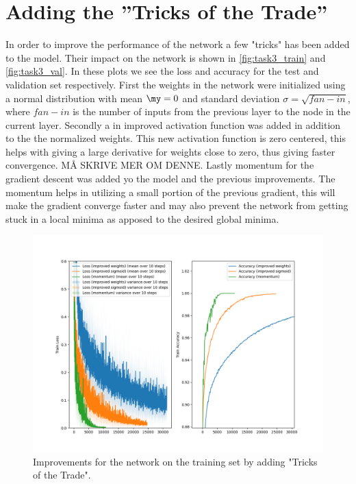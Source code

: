 \documentclass{article}
\begin{document}
\section{Adding the ”Tricks of the Trade”}
In order to improve the performance of the network a few "tricks" has been added to the model. Their impact on the network is shown in \autoref{fig:task3_train} and \autoref{fig:task3_val}. In these plots we see the loss and accuracy for the test and validation set respectively. First the weights in the network were initialized using a normal distribution with mean $\my = 0$ and standard deviation $\sigma = \sqrt{fan-in}$, where $fan-in$ is the number of inputs from the previous layer to the node in the current layer. Secondly a in improved activation function was added in addition to the the normalized weights. This new activation function is zero centered, this helps with giving a large derivative for weights close to zero, thus giving faster convergence. MÅ SKRIVE MER OM DENNE.
Lastly momentum for the gradient descent was added yo the model and the previous improvements. The momentum helps in utilizing a small portion of the previous gradient, this will make the gradient converge faster and may also prevent the network from getting stuck in a local minima as apposed to the desired global minima. 
\begin{figure}[H]
    \centering
    \includegraphics[width=\textwidth]{Assignments/Assignment_2/plots/task3/task3_train.png}
    \caption{Improvements for the network on the training set by adding "Tricks of the Trade".}
    \label{fig:task3_train}
\end{figure}
\end{document}
